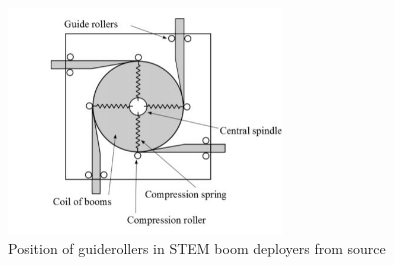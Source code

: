 \begin{figure}[!hbt]
    \centering
    \includegraphics[height=6cm]{images/guiderollers.jpg}
    \caption{Position of guiderollers in STEM boom deployers from source \cite{Hoskin2015}}
    \label{fig:guiderollers}
\end{figure}


